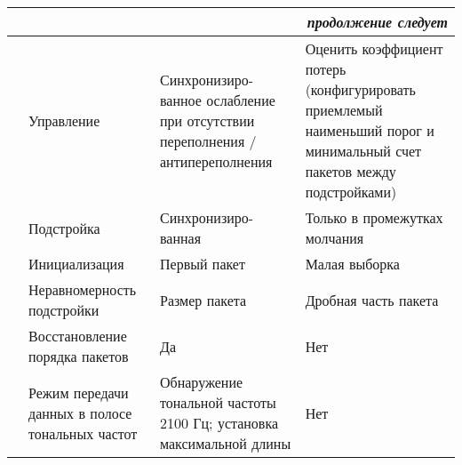 \begin{longtable}{|p{3cm}||p{4cm}|p{4cm}|p{3.5cm}|}
                                              \endhead        
 \multicolumn{4}{|r|}{\small\slshape продолжение следует}  \\ \hline
                                              \endfoot        \hline
                                              \endlastfoot
\multirow{6}{*}{Адаптивный}    & Управление                                                          & Синхронизиро- ванное ослабление при отсутствии переполнения / антипереполнения & Оценить коэффициент потерь (конфигурировать приемлемый наименьший порог и минимальный счет пакетов между подстройками) \\ 
\cline{2-4}
                               & Подстройка                                                          & Синхронизиро- ванная                                                           & Только в промежутках молчания                                                                                          \\
\cline{2-4}
                               & Инициализация                                                       & Первый пакет                                                                 & Малая выборка                                                                                                          \\ 
\cline{2-4}
                               & Неравномерность подстройки                                          & Размер пакета                                                                & Дробная часть пакета                                                                                                   \\ 
\cline{2-4}
                               & Восстановление порядка пакетов                                      & Да                                                                           & Нет                                                                                                                    \\ 
\cline{2-4}
                               & Режим передачи данных в полосе тональных частот                     & Обнаружение тональной частоты 2100 Гц; установка максимальной длины          & Нет                                                                                                                    \\ 
\hline
    \end{longtable}



